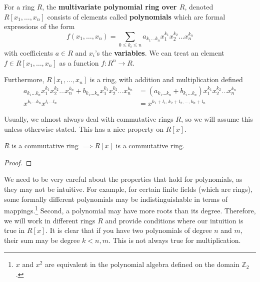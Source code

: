   \begin{definition} 
    For a ring $R$, the \textbf{multivariate polynomial ring over $R$}, denoted $R[x_1, \ldots, x_n]$ consists of elements called \textbf{polynomials} which are formal expressions of the form 
    \begin{equation}
      f(x_1, \ldots, x_n) = \sum_{0 \leq k_i \leq n} a_{k_1 \ldots k_n} x_1^{k_1} x_2^{k_2} \ldots x_n^{k_n}
    \end{equation}
    with coefficients $a \in R$ and $x_i$'s the \textbf{variables}. We can treat an element $f \in R[x_1, \ldots, x_n]$ as a function $f: R^n \rightarrow R$.  

    Furthermore, $R[x_1, \ldots, x_n]$ is a ring, with addition and multiplication defined 
    \begin{align}
      a_{k_1 \ldots k_n} x_1^{k_1} x_2^{k_2} \ldots x_n^{k_n} + b_{k_1 \ldots k_n} x_1^{k_1} x_2^{k_2} \ldots x_n^{k_n} & = (a_{k_1 \ldots k_n} + b_{k_1 \ldots k_n}) x_1^{k_1} x_2^{k_2} \ldots x_n^{k_n} \\
      x^{k_1 \ldots k_n} x^{l_1 \ldots l_n} & = x^{k_1 + l_1, k_2 + l_2, \ldots, k_n + l_n}
    \end{align}
  \end{definition}

  Usually, we almost always deal with commutative rings $R$, so we will assume this unless otherwise stated. This has a nice property on $R[x]$. 

  \begin{lemma}
    $R$ is a commutative ring $\implies R[x]$ is a commutative ring. 
  \end{lemma}
  \begin{proof}
    
  \end{proof}

  We need to be very careful about the properties that hold for polynomials, as they may not be intuitive. For example, for certain finite fields (which are rings), some formally different polynomials may be indistinguishable in terms of mappings.\footnote{$x$ and $x^2$ are equivalent in the polynomial algebra defined on the domain $\mathbb{Z}_2$. } Second, a polynomial may have more roots than its degree. Therefore, we will work in different rings $R$ and provide conditions where our intuition is true in $R[x]$. It is clear that if you have two polynomials of degree $n$ and $m$, their sum may be degree $k < n, m$. This is not always true for multiplication. 

